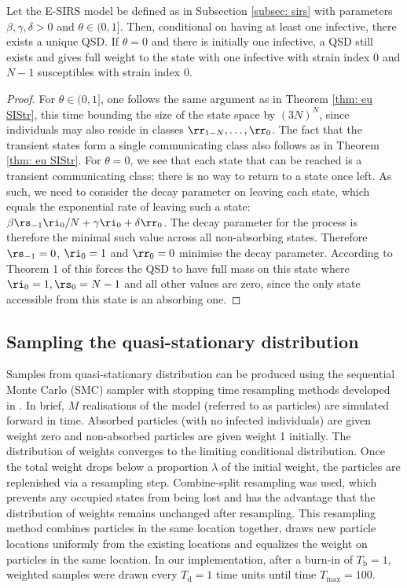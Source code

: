 \documentclass[review]{elsarticle}
\begin{document}
\begin{mythm}\label{thm: eu SIRStr}
	Let the E-SIRS model be defined as in Subsection \ref{subsec: sirs} with parameters $\beta, \gamma, \delta > 0$ and $\theta \in (0,1]$. Then, conditional on having at least one infective, there exists a unique QSD. If $\theta = 0$ and there is initially one infective, a QSD still exists and gives full weight to the state with one infective with strain index $0$ and $N-1$ susceptibles with strain index $0$.
\end{mythm}
\begin{proof}
	For $\theta \in (0,1]$, one follows the same argument as in Theorem \ref{thm: eu SIStr}, this time bounding the size of the state space by $(3N)^N$, since individuals may also reside in classes $\rr_{1-N}, \dots, \rr_0$. The fact that the transient states form a single communicating class also follows as in Theorem \ref{thm: eu SIStr}.
	For $\theta = 0$, we see that each state that can be reached is a transient communicating class; there is no way to return to a state once left. As such, we need to consider the decay parameter on leaving each state, which equals the exponential rate of leaving such a state: $\beta \rs_{-1} \ri_{0} /N + \gamma \ri_0 + \delta \rr_0$. The decay parameter for the process is therefore the minimal such value across all non-absorbing states. Therefore $\rs_{-1} = 0$, $\ri_0 = 1$ and $\rr_0 = 0$ minimise the decay parameter. According to Theorem 1 of \cite{vanDoorn2008} this forces the QSD to have full mass on this state where $\ri_0 = 1, \rs_0 = N-1$ and all other values are zero, since the only state accessible from this state is an absorbing one.
\end{proof}

\subsection{Sampling the quasi-stationary distribution}\label{sampling}

Samples from quasi-stationary distribution can be produced using the sequential Monte Carlo (SMC) sampler with stopping time resampling methods developed in \cite{griffin2016}. In brief, $M$ realisations of the model (referred to as particles) are simulated forward in time. Absorbed particles (with no infected individuals) are given weight zero and non-absorbed particles are given weight 1 initially. The distribution of weights converges to the limiting conditional distribution. Once the total weight drops below a proportion $\lambda$ of the initial weight, the particles are replenished via a resampling step. Combine-split resampling \cite{griffin2016} was used, which prevents any occupied states from being lost and has the advantage that the distribution of weights remains unchanged after resampling. This resampling method combines particles in the same location together, draws new particle locations uniformly from the existing locations and equalizes the weight on particles in the same location.  In our implementation, after a burn-in of $T_\text{b}=1$, weighted samples were drawn every $T_\text{d}=1$ time units until time $T_\text{max}=100$. 
\end{document}
